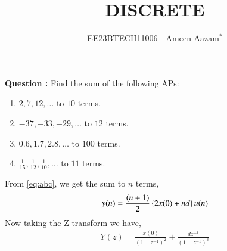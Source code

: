 \documentclass[journal,12pt,twocolumn]{IEEEtran}
\theoremstyle{remark}
\begin{document}

\vspace{3cm}

\title{DISCRETE}
\author{EE23BTECH11006 - Ameen Aazam$^{*}$%
}
\maketitle
\newpage
\bigskip

\renewcommand{\thefigure}{\theenumi}
\renewcommand{\thetable}{\theenumi}

\vspace{3cm}
\textbf{Question :}
Find the sum of the following APs:
\begin{enumerate}[label=(\alph*)]
\item $2, 7, 12, \ldots$ to $10$ terms.
\item $-37, -33, -29, \ldots$ to $12$ terms.
\item $0.6, 1.7, 2.8, \ldots$ to $100$ terms.
\item $\frac{1}{15}, \frac{1}{12}, \frac{1}{10}, \ldots$ to $11$ terms.
\end{enumerate}
\solution

From \eqref{eq:abc}, we get the sum to $n$ terms,
\begin{align}
    y(n)=\frac{(n+1)}{2}\left\{2x(0)+nd\right\}u(n)
\end{align}
Now taking the Z-transform we have,
\begin{align}
    Y(z)=\frac{x(0)}{(1-z^{-1})^2}+\frac{dz^{-1}}{(1-z^{-1})^3}
\end{align}
\end{document}
